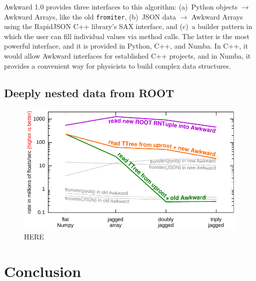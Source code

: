 \documentclass{webofc}
\begin{document}
Awkward 1.0 provides three interfaces to this algorithm: (a)~Python objects $\to$ Awkward Arrays, like the old \texttt{fromiter}, (b)~JSON data $\to$ Awkward Arrays using the RapidJSON C++ library's SAX interface, and (c)~a builder pattern in which the user can fill individual values via method calls. The latter is the most powerful interface, and it is provided in Python, C++, and Numba. In C++, it would allow Awkward interfaces for established C++ projects, and in Numba, it provides a convenient way for physicists to build complex data structures.

\subsection{Deeply nested data from ROOT}

\begin{figure}
\begin{center}
\includegraphics[width=0.75\linewidth]{read_ttree.pdf}
\end{center}
\caption{HERE \label{fig:read_ttree}}
\end{figure}


\section{Conclusion}






\end{document}
